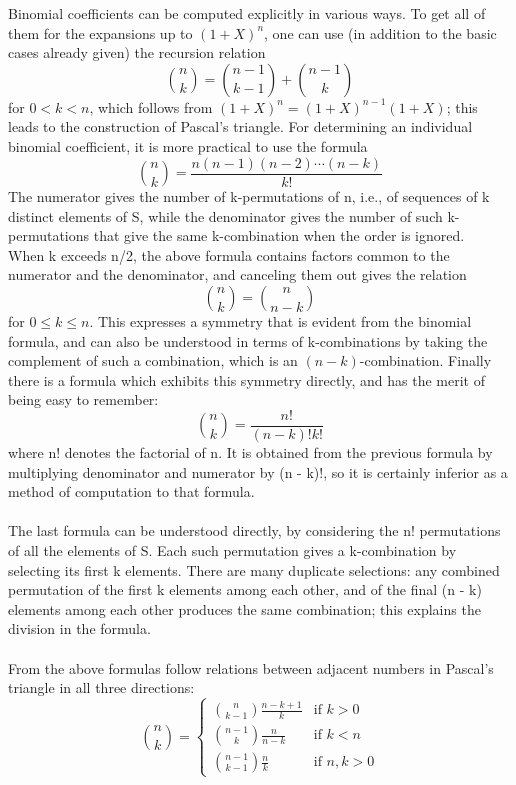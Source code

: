 \documentclass[12pt]{article}
\begin{document}
Binomial coefficients can be computed explicitly in various ways. To get all of them for the expansions up to $(1 + X)^n$, one can use (in addition to the basic cases already given) the recursion relation
$${\binom {n}{k}}={\binom {n-1}{k-1}}+{\binom {n-1}{k}}$$
for $0 < k < n$, which follows from $ (1 + X)^n = (1 + X)^{n-1}(1+X)$; this leads to the construction of Pascal's triangle.
For determining an individual binomial coefficient, it is more practical to use the formula
$${\binom {n}{k}}=\frac{n(n-1)(n-2)\cdots (n-k)}{k!}$$
The numerator gives the number of k-permutations of n, i.e., of sequences of k distinct elements of S, while the denominator gives the number of such k-permutations that give the same k-combination when the order is ignored.\\
When k exceeds n/2, the above formula contains factors common to the numerator and the denominator, and canceling them out gives the relation
$${\binom {n}{k}}={\binom {n}{n-k}}$$
for $0\le k\le n$. This expresses a symmetry that is evident from the binomial formula, and can also be understood in terms of k-combinations by taking the complement of such a combination, which is an $(n-k)$-combination.
Finally there is a formula which exhibits this symmetry directly, and has the merit of being easy to remember:
$${\binom {n}{k}}=\frac{n!}{(n-k)!k!}$$
where n! denotes the factorial of n. It is obtained from the previous formula by multiplying denominator and numerator by (n - k)!, so it is certainly inferior as a method of computation to that formula.\\\\
The last formula can be understood directly, by considering the n! permutations of all the elements of S. Each such permutation gives a k-combination by selecting its first k elements. There are many duplicate selections: any combined permutation of the first k elements among each other, and of the final (n - k) elements among each other produces the same combination; this explains the division in the formula.\\\\
From the above formulas follow relations between adjacent numbers in Pascal's triangle in all three directions:
$${\binom {n}{k}}=
\begin{cases}
{\binom {n}{k-1}}\frac {n-k+1}{k} &\text{if } k>0\\
{\binom {n-1}{k}}\frac{n}{n-k}&\text{if }k<n\\
{\binom {n-1}{k-1}}\frac{n}{k}&\text{if } n,k>0
\end{cases}
$$
\end{document}
